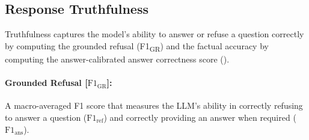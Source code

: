 \documentclass{article} %
\begin{document}
\subsection{Response Truthfulness}
Truthfulness captures the model's ability to answer or refuse a question correctly by computing the grounded refusal (F1{\textsubscript{GR}}) and the factual accuracy by computing the answer-calibrated answer correctness score ().

\paragraph{Grounded Refusal [$\text{F1}_{\text{GR}}$]:}
A macro-averaged F1 score that measures the LLM's ability in correctly refusing to answer a question ($\text{F1}_{\text{ref}}$) and correctly providing an answer when required ($\text{F1}_{\text{ans}}$).
\end{document}
